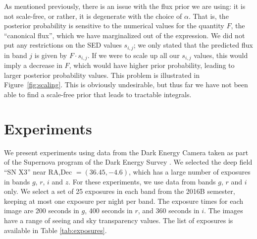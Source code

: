 \documentclass[letterpaper,preprint]{aastex62}
\newcommand{\figref}[1]{\mbox{Figure~\ref{#1}}}
\begin{document}
As mentioned previously, there is an issue with the flux prior we are
using: it is not scale-free, or rather, it is degenerate with the
choice of $\alpha$.  That is, the posterior probability is sensitive
to the numerical values for the quantity $F$, the ``canonical flux'',
which we have marginalized out of the expression.  We did not put any
restrictions on the SED values $s_{i,j}$; we only stated that the
predicted flux in band $j$ is given by $F \cdot s_{i,j}$.  If we were
to scale up all our $s_{i,j}$ values, this would imply a decrease in
$F$, which would have higher prior probability, leading to larger
posterior probability values.  This problem is illustrated in
\figref{fig:scaling}.  This is obviously undesirable, but thus far we
have not been able to find a scale-free prior that leads to tractable
integrals.





\section{Experiments}

We present experiments using data from the Dark Energy Camera
\citep{decam} taken as part of the Supernova program \citep{dessn} of
the Dark Energy Survey \citep{des}.  We selected the deep field ``SN
X3'' near RA,Dec $= (36.45, -4.6)$, which has a large number of
exposures in bands $g$, $r$, $i$ and $z$.  For these experiments, we
use data from bands $g$, $r$ and $i$ only.  We select a set of 25
exposures in each band from the 2016B semester, keeping at most one
exposure per night per band.  The exposure times for each image are
200 seconds in $g$, 400 seconds in $r$, and 360 seconds in $i$.  The
images have a range of seeing and sky transparency values.  The list
of exposures is available in Table \ref{tab:exposures}.
\end{document}
